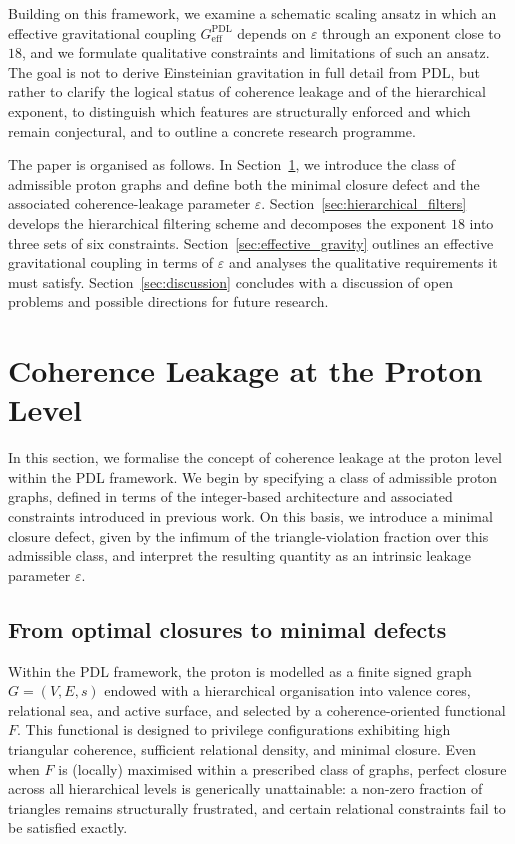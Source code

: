 \documentclass[11pt,a4paper]{article}
\theoremstyle{definition}
\newcommand{\PDL}{\mathrm{PDL}}
\begin{document}
Building on this framework, we examine a schematic scaling ansatz in which an effective gravitational coupling $G_{\mathrm{eff}}^{\PDL}$ depends on $\varepsilon$ through an exponent close to $18$, and we formulate qualitative constraints and limitations of such an ansatz.\cite{Exponent_18_PDL_2026,Effective_Fields_PDL_2026} The goal is not to derive Einsteinian gravitation in full detail from PDL, but rather to clarify the logical status of coherence leakage and of the hierarchical exponent, to distinguish which features are structurally enforced and which remain conjectural, and to outline a concrete research programme.

The paper is organised as follows. In Section~\ref{sec:epsilon_proton}, we introduce the class of admissible proton graphs and define both the minimal closure defect and the associated coherence-leakage parameter $\varepsilon$. Section~\ref{sec:hierarchical_filters} develops the hierarchical filtering scheme and decomposes the exponent $18$ into three sets of six constraints. Section~\ref{sec:effective_gravity} outlines an effective gravitational coupling in terms of $\varepsilon$ and analyses the qualitative requirements it must satisfy. Section~\ref{sec:discussion} concludes with a discussion of open problems and possible directions for future research.

\section{Coherence Leakage at the Proton Level}
\label{sec:epsilon_proton}

In this section, we formalise the concept of coherence leakage at the proton level within the PDL framework. We begin by specifying a class of admissible proton graphs, defined in terms of the integer-based architecture and associated constraints introduced in previous work.\cite{Combinatorial_Proton_v2_2026,PDL_Global_Mapping_2026} On this basis, we introduce a minimal closure defect, given by the infimum of the triangle-violation fraction over this admissible class, and interpret the resulting quantity as an intrinsic leakage parameter $\varepsilon$.\cite{Exponent_18_PDL_2026,Topological_Reformulation_PDL_2026}

\subsection{From optimal closures to minimal defects}

Within the PDL framework, the proton is modelled as a finite signed graph $G = (V, E, s)$ endowed with a hierarchical organisation into valence cores, relational sea, and active surface, and selected by a coherence-oriented functional $F$. This functional is designed to privilege configurations exhibiting high triangular coherence, sufficient relational density, and minimal closure.\cite{PDL_Main_2026,Combinatorial_Proton_v2_2026,PDL_Global_Mapping_2026} Even when $F$ is (locally) maximised within a prescribed class of graphs, perfect closure across all hierarchical levels is generically unattainable: a non-zero fraction of triangles remains structurally frustrated, and certain relational constraints fail to be satisfied exactly.\cite{Topological_Reformulation_PDL_2026}
\end{document}
